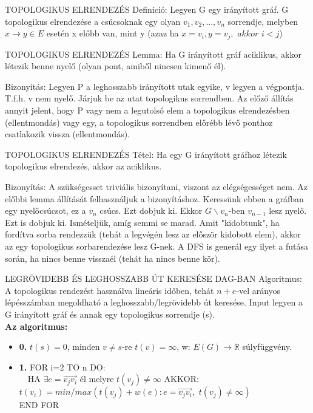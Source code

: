 \documentclass[]{article}
\begin{document}
\begin{shaded}
TOPOLOGIKUS ELRENDEZÉS Definíció: Legyen G egy irányított gráf. G topologikus elrendezése a csúcsoknak egy olyan $v_1, v_2,..., v_n$ sorrendje, melyben $x\rightarrow y \in E$ esetén x előbb van, mint y (azaz ha $x = v_i, y = v_j,\,\,akkor\,\,i<j$)
\end{shaded}
\begin{framed}
TOPOLOGIKUS ELRENDEZÉS Lemma: Ha G irányított gráf aciklikus, akkor létezik benne nyelő (olyan pont, amiből nincsen kimenő él).
\end{framed}
\begin{leftbar}
Bizonyítás: Legyen P a leghosszabb irányított utak egyike, v legyen a végpontja. T.f.h. v nem nyelő. Járjuk be az utat topologikus sorrendben. Az előző állítás annyit jelent, hogy P vagy nem a legutolsó elem a topologikus elrendezésben (ellentmondás) vagy egy, a topologikus sorrendben előrébb lévő ponthoz csatlakozik vissza (ellentmondás).
\end{leftbar}
\begin{framed}
TOPOLOGIKUS ELRENDEZÉS Tétel: Ha egy G irányított gráfhoz létezik topologikus elrendezés, akkor az aciklikus.
\end{framed}
\begin{leftbar}
Bizonyítás: A szükségesset triviális bizonyítani, viszont az elégségességet nem. Az előbbi lemma állítását felhasználjuk a bizonyításhoz. Keressünk ebben a gráfban egy nyelőcsúcsot, ez a $v_n$ csúcs. Ezt dobjuk ki. Ekkor $G\backslash{v_n}$-ben $v_{n-1}$ lesz nyelő. Ezt is dobjuk ki. Ismételjük, amíg semmi se marad. Amit "kidobtunk", ha fordítva sorba rendezzük (tehát a legvégén lesz az először kidobott elem), akkor az egy topologikus sorbarendezése lesz G-nek. A DFS is generál egy ilyet a futása során, ha nincs benne visszaél (tehát ha nincs benne kör).
\end{leftbar}
\begin{framed}
LEGRÖVIDEBB ÉS LEGHOSSZABB ÚT KERESÉSE DAG-BAN Algoritmus: A topologikus rendezést használva lineáris időben, tehát $n+e$-vel arányos lépésszámban megoldható a leghosszabb/legrövidebb út keresése.
Input legyen a G irányított gráf és annak egy topologikus sorrendje (s).
\\
\textbf{Az algoritmus:}
\begin{itemize}
\item{\textbf{0.}} $t(s) = 0$, minden $v \neq s$-re $t(v) = \infty$, w: $E(G)\rightarrow \mathbb{R}$ súlyfüggvény.
\item{\textbf{1.}} FOR i=2 TO n DO:\\
	$\quad$HA $\exists e = \overrightarrow{v_jv_i}$ él melyre $t(v_j) \neq \infty$ AKKOR: $t(v_i) = min/max(t(v_j)+w(e): e = \overrightarrow{v_jv_i},\,\, t(v_j) \neq \infty)$
\\END FOR
\end{itemize}
\end{framed}
\end{document}
